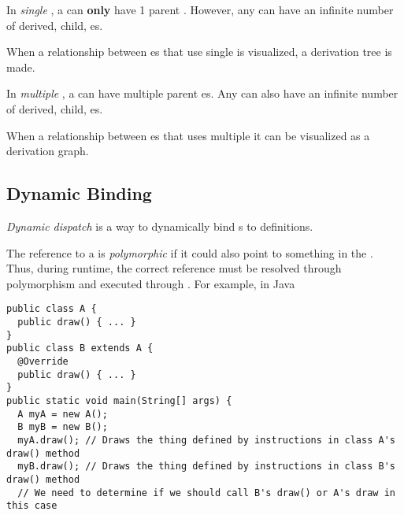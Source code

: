 \begin{definition}\label{def:OOP_Single_Inheritance}
  In \emph{single }, a  can \textbf{only} have 1 parent .
  However, any  can have an infinite number of derived, child, es.

  When a relationship between es that use single  is visualized, a derivation tree is made.
\end{definition}

\begin{definition}\label{def:OOP_Multiple_Inheritance}
  In \emph{multiple }, a  can have multiple parent es.
  Any  can also have an infinite number of derived, child, es.

  When a relationship between es that uses multiple  it can be visualized as a derivation graph.
\end{definition}

\subsection{Dynamic Binding}\label{subsec:OOP_Dynamic_Binding}
\begin{definition}\label{def:OOP_Dynamic_Dispatch}
  \emph{Dynamic dispatch} is a way to dynamically bind s to  definitions.
\end{definition}

\begin{definition}[Polymorphic]\label{def:OOP_Polymorphic}
  The reference to a  is \emph{polymorphic} if it could also point to something in the .
  Thus, during runtime, the correct reference must be resolved through polymorphism and executed through .
  For example, in Java
\begin{verbatim}
public class A {
  public draw() { ... }
}
public class B extends A {
  @Override
  public draw() { ... }
}
public static void main(String[] args) {
  A myA = new A();
  B myB = new B();
  myA.draw(); // Draws the thing defined by instructions in class A's draw() method
  myB.draw(); // Draws the thing defined by instructions in class B's draw() method
  // We need to determine if we should call B's draw() or A's draw in this case
\end{verbatim}
\end{definition}

